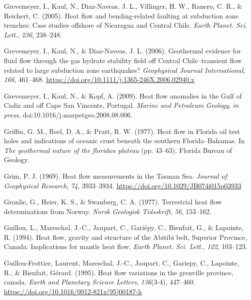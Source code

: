 \documentclass[draft,linenumbers]{agujournal2018}
\begin{document}
\leavevmode{}%
Grevemeyer, I., Kaul, N., Diaz-Naveas, J. L., Villinger, H. W., Ranero,
C. R., \& Reichert, C. (2005). Heat flow and bending-related faulting at
subduction zone trenches: Case studies offshore of {Nicaragua and
Central Chile}. \emph{Earth Planet. Sci. Lett.}, \emph{236}, 238--248.

\leavevmode{}%
Grevemeyer, I., Kaul, N., \& Diaz-Naveas, J. L. (2006). Geothermal
evidence for fluid flow through the gas hydrate stability field off
{Central Chile}--transient flow related to large subduction zone
earthquakes? \emph{Geophysical Journal International}, \emph{166},
461--468. \url{https://doi.org/10.1111/j.1365-246X.2006.02940.x}

\leavevmode{}%
Grevemeyer, I., Kaul, N., \& Kopf, A. (2009). Heat flow anomalies in the
{Gulf of Cadiz} and off {Cape San Vincente, Portugal}. \emph{Marine and
Petroleum Geology}, \emph{in press},
doi:10.1016/j.marpetgeo.2008.08.006.

\leavevmode{}%
Griffin, G. M., Reel, D. A., \& Pratt, R. W. (1977). Heat flow in
{Florida} oil test holes and indications of oceanic crust beneath the
southern {Florida--Bahamas}. In \emph{The geothermal nature of the
floridan plateau} (pp. 43--63). Florida Bureau of Geology.

\leavevmode{}%
Grim, P. J. (1969). Heat flow measurements in the {Tasman Sea}.
\emph{Journal of Geophysical Research}, \emph{74}, 3933--3934.
\url{https://doi.org/10.1029/JB074i015p03933}

\leavevmode{}%
Gronlie, G., Heier, K. S., \& Swanberg, C. A. (1977). Terrestrial heat
flow determinations from {Norway}. \emph{Norsk Geologisk Tidsskrift},
\emph{56}, 153--162.

\leavevmode{}%
Guillou, L., Mareschal, J.-C., Jaupart, C., Gariépy, C., Bienfait, G.,
\& Lapointe, R. (1994). Heat flow, gravity and structure of the
{Abitibi} belt, {Superior Province, Canada}: Implications for mantle
heat flow. \emph{Earth Planet. Sci. Lett.}, \emph{122}, 103--123.

\leavevmode{}%
Guillou-Frottier, Laurent, Mareschal, J.-C., Jaupart, C., Gariepy, C.,
Lapointe, R., \& Bienfait, Gérard. (1995). Heat flow variations in the
grenville province, canada. \emph{Earth and Planetary Science Letters},
\emph{136}(3-4), 447--460.
\url{https://doi.org/10.1016/0012-821x(95)00187-h}
\end{document}
